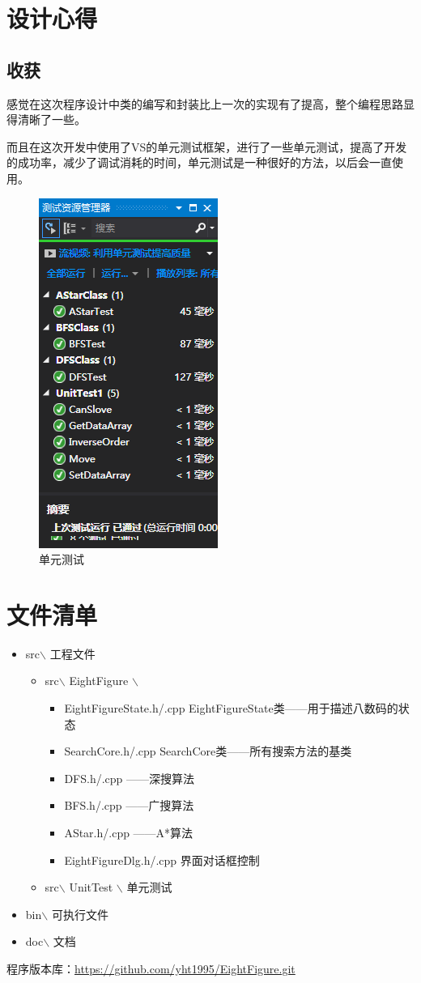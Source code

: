 \documentclass[12pt,a4paper]{article}
\begin{document}
\section{设计心得}
\subsection{收获}
感觉在这次程序设计中类的编写和封装比上一次的实现有了提高，整个编程思路显得清晰了一些。\par
而且在这次开发中使用了VS的单元测试框架，进行了一些单元测试，提高了开发的成功率，减少了调试消耗的时间，单元测试是一种很好的方法，以后会一直使用。
\begin{figure}[H]
\centering
\includegraphics{2.png}
\caption{单元测试} 
\end{figure}
\section{文件清单}
\begin{itemize}
\item src$\backslash$ 工程文件
\begin{itemize}
\item src$\backslash$ EightFigure $\backslash$
\begin{itemize}
\item EightFigureState.h/.cpp EightFigureState类——用于描述八数码的状态
\item SearchCore.h/.cpp SearchCore类——所有搜索方法的基类
\item DFS.h/.cpp ——深搜算法
\item BFS.h/.cpp ——广搜算法
\item AStar.h/.cpp ——A*算法
\item EightFigureDlg.h/.cpp  界面对话框控制
\end{itemize}
\item src$\backslash$ UnitTest $\backslash$ 单元测试
\end{itemize}
\item bin$\backslash$ 可执行文件
\item doc$\backslash$ 文档
\end{itemize}
程序版本库：\url{https://github.com/yht1995/EightFigure.git}
\end{document}
